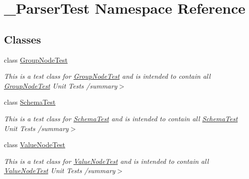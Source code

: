 \hypertarget{namespace__1920_parser_test}{}\section{\+\_\+Parser\+Test Namespace Reference}
\label{namespace__1920_parser_test}
\subsection*{Classes}
\begin{DoxyCompactItemize}
\item 
class \hyperlink{class__1920_parser_test_1_1_group_node_test}{Group\+Node\+Test}
\begin{DoxyCompactList}\small\item\em This is a test class for \hyperlink{class__1920_parser_test_1_1_group_node_test}{Group\+Node\+Test} and is intended to contain all \hyperlink{class__1920_parser_test_1_1_group_node_test}{Group\+Node\+Test} Unit Tests /summary$>$ \end{DoxyCompactList}\item 
class \hyperlink{class__1920_parser_test_1_1_schema_test}{Schema\+Test}
\begin{DoxyCompactList}\small\item\em This is a test class for \hyperlink{class__1920_parser_test_1_1_schema_test}{Schema\+Test} and is intended to contain all \hyperlink{class__1920_parser_test_1_1_schema_test}{Schema\+Test} Unit Tests /summary$>$ \end{DoxyCompactList}\item 
class \hyperlink{class__1920_parser_test_1_1_value_node_test}{Value\+Node\+Test}
\begin{DoxyCompactList}\small\item\em This is a test class for \hyperlink{class__1920_parser_test_1_1_value_node_test}{Value\+Node\+Test} and is intended to contain all \hyperlink{class__1920_parser_test_1_1_value_node_test}{Value\+Node\+Test} Unit Tests /summary$>$ \end{DoxyCompactList}\end{DoxyCompactItemize}
